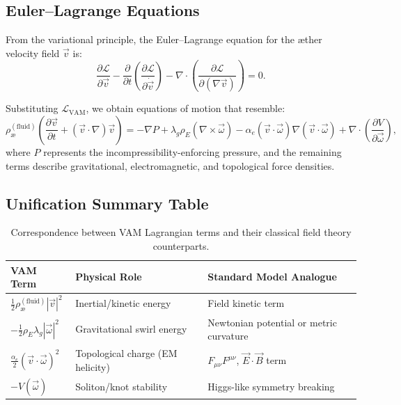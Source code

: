 \documentclass[preprint]{revtex4-2}
\begin{document}
\subsection{Euler--Lagrange Equations}

From the variational principle, the Euler--Lagrange equation for the \ae{}ther velocity field $\vec{v}$ is:
\begin{equation}
\frac{\partial \mathcal{L}}{\partial \vec{v}}
- \frac{\partial}{\partial t} \left( \frac{\partial \mathcal{L}}{\partial \dot{\vec{v}}} \right)
- \nabla \cdot \left( \frac{\partial \mathcal{L}}{\partial (\nabla \vec{v})} \right) = 0.
\end{equation}

Substituting $\mathcal{L}_{\text{VAM}}$, we obtain equations of motion that resemble:
\begin{equation}
\rho_\text{\ae}^{(\text{fluid})} \left( \frac{\partial \vec{v}}{\partial t} + (\vec{v} \cdot \nabla)\vec{v} \right)
= - \nabla P
+ \lambda_g \rho_{\scriptscriptstyle\boldsymbol\!E}(\nabla \times \vec{\omega})
- \alpha_e (\vec{v} \cdot \vec{\omega}) \nabla (\vec{v} \cdot \vec{\omega})
+ \nabla \cdot \left( \frac{\partial V}{\partial \vec{\omega}} \right),
\end{equation}
where $P$ represents the incompressibility-enforcing pressure, and the remaining terms describe gravitational, electromagnetic, and topological force densities.

\subsection{Unification Summary Table}

\begin{table}[H]
\centering
\renewcommand{\arraystretch}{1.3}
\begin{tabular}{|l|l|l|}
\hline
\textbf{VAM Term} & \textbf{Physical Role} & \textbf{Standard Model Analogue} \\
\hline
$\frac{1}{2} \rho_\text{\ae}^{(\text{fluid})} |\vec{v}|^2$ & Inertial/kinetic energy & Field kinetic term \\
$-\frac{1}{2} \rho_{\scriptscriptstyle\boldsymbol\!E}\lambda_g |\vec{\omega}|^2$ & Gravitational swirl energy & Newtonian potential or metric curvature \\
$\frac{\alpha_e}{2} (\vec{v} \cdot \vec{\omega})^2$ & Topological charge (EM helicity) & $F_{\mu\nu}F^{\mu\nu}$, $\vec{E}\cdot\vec{B}$ term \\
$-V(\vec{\omega})$ & Soliton/knot stability & Higgs-like symmetry breaking \\
\hline
\end{tabular}
\caption{Correspondence between VAM Lagrangian terms and their classical field theory counterparts.}
\end{table}
\end{document}
